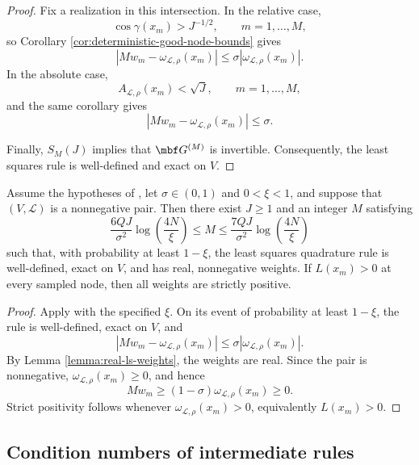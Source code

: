 \documentclass[10pt,dvipsnames]{amsart}
\begin{document}
\begin{proof}
Fix a realization in this intersection. In the relative case,
\[
    \cos\gamma(x_m)>J^{-1/2},
    \qquad m=1,\ldots,M,
\]
so Corollary \ref{cor:deterministic-good-node-bounds} gives
\[
    \left|
        M w_m-\omega_{\mathcal L,\rho}(x_m)
    \right|
    \leq
    \sigma
    \left|
        \omega_{\mathcal L,\rho}(x_m)
    \right|.
\]
In the absolute case,
\[
    A_{\mathcal L,\rho}(x_m)<\sqrt J,
    \qquad m=1,\ldots,M,
\]
and the same corollary gives
\[
    \left|
        M w_m-\omega_{\mathcal L,\rho}(x_m)
    \right|
    \leq
    \sigma.
\]

Finally, \(S_M(J)\) implies that \(\mbf G^{(M)}\) is invertible.
Consequently, the least squares rule is well-defined and exact on \(V\).
\end{proof}

\begin{corollary}
\label{cor:positive-intermediate-rule}
Assume the hypotheses of , let
\(\sigma\in(0,1)\) and \(0<\xi<1\), and suppose that
\((V,\mathcal L)\) is a nonnegative pair. Then there exist \(J\geq1\) and
an integer \(M\) satisfying
\[
    \frac{6QJ}{\sigma^2}\log\left(\frac{4N}{\xi}\right)
    \leq M \leq
    \frac{7QJ}{\sigma^2}\log\left(\frac{4N}{\xi}\right)
\]
such that, with probability at least \(1-\xi\), the least squares quadrature
rule is well-defined, exact on \(V\), and has real, nonnegative weights. If
\(L(x_m)>0\) at every sampled node, then all weights are strictly positive.
\end{corollary}

\begin{proof}
Apply  with the specified \(\xi\). On its event
of probability at least \(1-\xi\), the rule is well-defined, exact on \(V\),
and
\[
    \left| M w_m-\omega_{\mathcal L,\rho}(x_m) \right|
    \leq
    \sigma \left| \omega_{\mathcal L,\rho}(x_m) \right|.
\]
By Lemma \ref{lemma:real-ls-weights}, the weights are real. Since the pair is
nonnegative, \(\omega_{\mathcal L,\rho}(x_m)\geq0\), and hence
\[
    M w_m
    \geq
    (1-\sigma)\omega_{\mathcal L,\rho}(x_m)
    \geq0.
\]
Strict positivity follows whenever
\(\omega_{\mathcal L,\rho}(x_m)>0\), equivalently \(L(x_m)>0\).
\end{proof}

\subsection{Condition numbers of intermediate rules}
\label{subsec:intermediate-condition-numbers}
\end{document}
